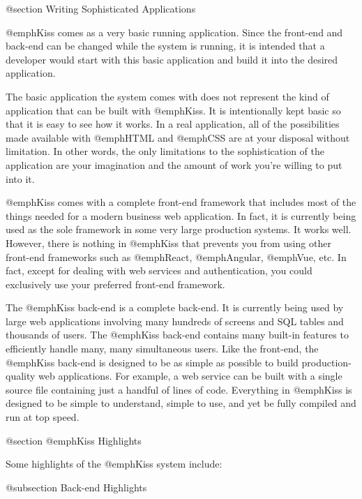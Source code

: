 @section Writing Sophisticated Applications

@emph{Kiss} comes as a very basic running application. Since the
front-end and back-end can be changed while the system is running, it
is intended that a developer would start with this basic application
and build it into the desired application.

The basic application the system comes with does not represent the
kind of application that can be built with @emph{Kiss}. It is
intentionally kept basic so that it is easy to see how it works.  In a
real application, all of the possibilities made available with
@emph{HTML} and @emph{CSS} are at your disposal without limitation. In
other words, the only limitations to the sophistication of the
application are your imagination and the amount of work you're willing
to put into it.

@emph{Kiss} comes with a complete front-end framework that includes
most of the things needed for a modern business web application. In
fact, it is currently being used as the sole framework in some very
large production systems.  It works well. However, there is nothing in
@emph{Kiss} that prevents you from using other front-end frameworks such as
@emph{React}, @emph{Angular}, @emph{Vue}, etc. In fact, except for
dealing with web services and authentication, you could exclusively
use your preferred front-end framework.

The @emph{Kiss} back-end is a complete back-end. It is currently
being used by large web applications involving many hundreds of
screens and SQL tables and thousands of users. The @emph{Kiss}
back-end contains many built-in features to efficiently handle many,
many simultaneous users. Like the front-end, the @emph{Kiss} back-end
is designed to be as simple as possible to build production-quality
web applications. For example, a web service can be built with a single
source file containing just a handful of lines of code. Everything in
@emph{Kiss} is designed to be simple to understand, simple to use, and
yet be fully compiled and run at top speed.

@section @emph{Kiss} Highlights

Some highlights of the @emph{Kiss} system include:

@subsection Back-end Highlights

